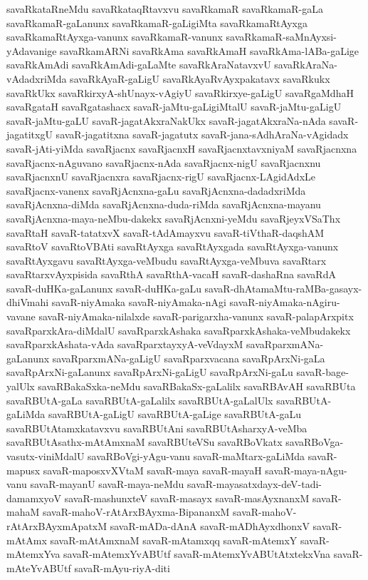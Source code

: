 {savaRkataRneMdu
savaRkataqRtavxvu
savaRkamaR
savaRkamaR-gaLa
savaRkamaR-gaLanunx
savaRkamaR-gaLigiMta
savaRkamaRtAyxga
savaRkamaRtAyxga-vanunx
savaRkamaR-vanunx
savaRkamaR-saMnAyxsi-yAdavanige
savaRkamARNi
savaRkAma
savaRkAmaH
savaRkAma-lABa-gaLige
savaRkAmAdi
savaRkAmAdi-gaLaMte
savaRkAraNatavxvU
savaRkAraNa-vAdadxriMda
savaRkAyaR-gaLigU
savaRkAyaRvAyxpakatavx
savaRkukx
savaRkUkx
savaRkirxyA-shUnayx-vAgiyU
savaRkirxye-gaLigU
savaRgaMdhaH
savaRgataH
savaRgatashacx
savaR-jaMtu-gaLigiMtalU
savaR-jaMtu-gaLigU
savaR-jaMtu-gaLU
savaR-jagatAkxraNakUkx
savaR-jagatAkxraNa-nAda
savaR-jagatitxgU
savaR-jagatitxna
savaR-jagatutx
savaR-jana-sAdhAraNa-vAgidadx
savaR-jAti-yiMda
savaRjacnx
savaRjacnxH
savaRjacnxtavxniyaM
savaRjacnxna
savaRjacnx-nAguvano
savaRjacnx-nAda
savaRjacnx-nigU
savaRjacnxnu
savaRjacnxnU
savaRjacnxra
savaRjacnx-rigU
savaRjacnx-LAgidAdxLe
savaRjacnx-vanenx
savaRjAcnxna-gaLu
savaRjAcnxna-dadadxriMda
savaRjAcnxna-diMda
savaRjAcnxna-duda-riMda
savaRjAcnxna-mayanu
savaRjAcnxna-maya-neMbu-dakekx
savaRjAcnxni-yeMdu
savaRjeyxVSaThx
savaRtaH
savaR-tatatxvX
savaR-tAdAmayxvu
savaR-tiVthaR-daqshAM
savaRtoV
savaRtoVBAti
savaRtAyxga
savaRtAyxgada
savaRtAyxga-vanunx
savaRtAyxgavu
savaRtAyxga-veMbudu
savaRtAyxga-veMbuva
savaRtarx
savaRtarxvAyxpisida
savaRthA
savaRthA-vacaH
savaR-dashaRna
savaRdA
savaR-duHKa-gaLanunx
savaR-duHKa-gaLu
savaR-dhAtamaMtu-raMBa-gasayx-dhiVmahi
savaR-niyAmaka
savaR-niyAmaka-nAgi
savaR-niyAmaka-nAgiru-vavane
savaR-niyAmaka-nilalxde
savaR-parigarxha-vanunx
savaR-palapArxpitx
savaRparxkAra-diMdalU
savaRparxkAshaka
savaRparxkAshaka-veMbudakekx
savaRparxkAshata-vAda
savaRparxtayxyA-veVdayxM
savaRparxmANa-gaLanunx
savaRparxmANa-gaLigU
savaRparxvacana
savaRpArxNi-gaLa
savaRpArxNi-gaLanunx
savaRpArxNi-gaLigU
savaRpArxNi-gaLu
savaR-bage-yalUlx
savaRBakaSxka-neMdu
savaRBakaSx-gaLalilx
savaRBAvAH
savaRBUta
savaRBUtA-gaLa
savaRBUtA-gaLalilx
savaRBUtA-gaLalUlx
savaRBUtA-gaLiMda
savaRBUtA-gaLigU
savaRBUtA-gaLige
savaRBUtA-gaLu
savaRBUtAtamxkatavxvu
savaRBUtAni
savaRBUtAsharxyA-veMba
savaRBUtAsathx-mAtAmxnaM
savaRBUteVSu
savaRBoVkatx
savaRBoVga-vasutx-viniMdalU
savaRBoVgi-yAgu-vanu
savaR-maMtarx-gaLiMda
savaR-mapusx
savaR-maposxvXVtaM
savaR-maya
savaR-mayaH
savaR-maya-nAgu-vanu
savaR-mayanU
savaR-maya-neMdu
savaR-mayasatxdayx-deV-tadi-damamxyoV
savaR-mashunxteV
savaR-masayx
savaR-masAyxnanxM
savaR-mahaM
savaR-mahoV-rAtArxBAyxma-BipananxM
savaR-mahoV-rAtArxBAyxmApatxM
savaR-mADa-dAnA
savaR-mADhAyxdhonxV
savaR-mAtAmx
savaR-mAtAmxnaM
savaR-mAtamxqq
savaR-mAtemxY
savaR-mAtemxYva
savaR-mAtemxYvABUtf
savaR-mAtemxYvABUtAtxtekxVna
savaR-mAteYvABUtf
savaR-mAyu-riyA-diti
}
